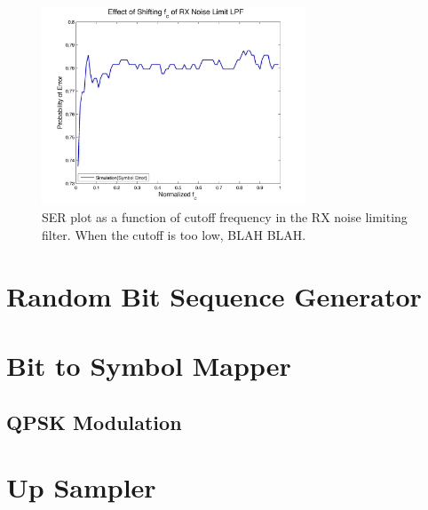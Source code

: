 \documentclass[]{article}
\begin{document}
\begin{figure}[H]
\centering
\hspace*{-2cm}\includegraphics[width=0.7\textwidth]{freqRX.jpg}
\caption{SER plot as a function of cutoff frequency in the RX noise limiting filter.  When the cutoff is too low, BLAH BLAH. \label{fig:freqRX}}
\end{figure}

\appendix
\newpage


\newpage
%

\section{Random Bit Sequence Generator}
\label{app:random_bit_generator}


\section{Bit to Symbol Mapper}
\label{app:bittosym}
\subsection{QPSK Modulation}
\label{app:qpsk_mod}


\section{Up Sampler}
\label{app:impulse_train}

\end{document}
